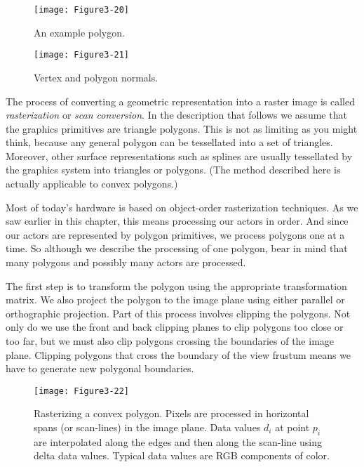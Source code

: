\begin{figure}[!htb]
  \centering
  \texttt{[image: Figure3-20]}\\
  \caption{An example polygon.}\label{fig:Figure3-20}
\end{figure}

\begin{figure}[!htb]
  \centering
  \texttt{[image: Figure3-21]}\\
  \caption{Vertex and polygon normals.}\label{fig:Figure3-21}
\end{figure}

The process of converting a geometric representation into a raster image is called \emph{rasterization} or \emph{scan conversion}. In the description that follows we assume that the graphics primitives are triangle polygons. This is not as limiting as you might think, because any general polygon can be tessellated into a set of triangles. Moreover, other surface representations such as splines are usually tessellated by the graphics system into triangles or polygons. (The method described here is actually applicable to convex polygons.)

Most of today's hardware is based on object-order rasterization techniques. As we saw earlier in this chapter, this means processing our actors in order. And since our actors are represented by polygon primitives, we process polygons one at a time. So although we describe the processing of one polygon, bear in mind that many polygons and possibly many actors are processed.

The first step is to transform the polygon using the appropriate transformation matrix. We also project the polygon to the image plane using either parallel or orthographic projection. Part of this process involves clipping the polygons. Not only do we use the front and back clipping planes to clip polygons too close or too far, but we must also clip polygons crossing the boundaries of the image plane. Clipping polygons that cross the boundary of the view frustum means we have to generate new polygonal boundaries.

\begin{figure}[!htb]
  \centering
  \texttt{[image: Figure3-22]}\\
  \caption{Rasterizing a convex polygon. Pixels are processed in horizontal spans (or scan-lines) in the image plane. Data values $d_i$ at point $p_i$ are interpolated along the edges and then along the scan-line using delta data values. Typical data values are RGB components of color.}\label{fig:Figure3-22}
\end{figure}

